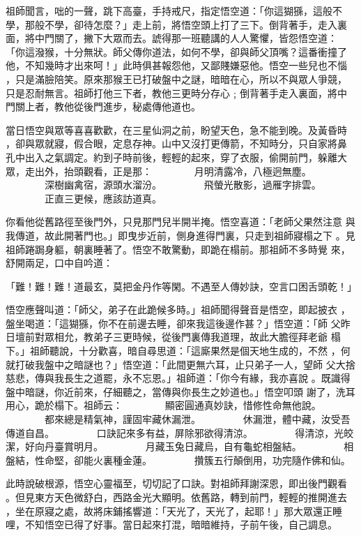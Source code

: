 \begin{pinyinscope}
{祖師聞言，咄的一聲，跳下高臺，手持戒尺，指定悟空道：「你這猢猻，這般不
學，那般不學，卻待怎麼？」走上前，將悟空頭上打了三下。倒背著手，走入裏
面，將中門關了，撇下大眾而去。諕得那一班聽講的人人驚懼，皆怨悟空道：
「你這潑猴，十分無狀。師父傳你道法，如何不學，卻與師父頂嘴？這番衝撞了
他，不知幾時才出來呵！」此時俱甚報怨他，又鄙賤嫌惡他。悟空一些兒也不惱
，只是滿臉陪笑。原來那猴王已打破盤中之謎，暗暗在心，所以不與眾人爭競，
只是忍耐無言。祖師打他三下者，教他三更時分存心﹔倒背著手走入裏面，將中
門關上者，教他從後門進步，秘處傳他道也。

當日悟空與眾等喜喜歡歡，在三星仙洞之前，盼望天色，急不能到晚。及黃昏時
，卻與眾就寢，假合眼，定息存神。山中又沒打更傳箭，不知時分，只自家將鼻
孔中出入之氣調定。約到子時前後，輕輕的起來，穿了衣服，偷開前門，躲離大
眾，走出外，抬頭觀看，正是那：
　　　　月明清露冷，八極迥無塵。
　　　　深樹幽禽宿，源頭水溜汾。
　　　　飛螢光散影，過雁字排雲。
　　　　正直三更候，應該訪道真。

你看他從舊路徑至後門外，只見那門兒半開半掩。悟空喜道：「老師父果然注意
與我傳道，故此開著門也。」即曳步近前，側身進得門裏，只走到祖師寢榻之下
。見祖師踡跼身軀，朝裏睡著了。悟空不敢驚動，即跪在榻前。那祖師不多時覺
來，舒開兩足，口中自吟道：


「難！難！難！道最玄，莫把金丹作等閑。不遇至人傳妙訣，空言口困舌頭乾！」

悟空應聲叫道：「師父，弟子在此跪候多時。」祖師聞得聲音是悟空，即起披衣
，盤坐喝道：「這猢猻，你不在前邊去睡，卻來我這後邊作甚？」悟空道：「師
父昨日壇前對眾相允，教弟子三更時候，從後門裏傳我道理，故此大膽徑拜老爺
榻下。」祖師聽說，十分歡喜，暗自尋思道：「這廝果然是個天地生成的，不然
，何就打破我盤中之暗謎也？」悟空道：「此間更無六耳，止只弟子一人，望師
父大捨慈悲，傳與我長生之道罷，永不忘恩。」祖師道：「你今有緣，我亦喜說
。既識得盤中暗謎，你近前來，仔細聽之，當傳與你長生之妙道也。」悟空叩頭
謝了，洗耳用心，跪於榻下。祖師云：
　　　　顯密圓通真妙訣，惜修性命無他說。
　　　　都來總是精氣神，謹固牢藏休漏泄。
　　　　休漏泄，體中藏，汝受吾傳道自昌。
　　　　口訣記來多有益，屏除邪欲得清涼。
　　　　得清涼，光皎潔，好向丹臺賞明月。
　　　　月藏玉兔日藏烏，自有龜蛇相盤結。
　　　　相盤結，性命堅，卻能火裏種金蓮。
　　　　攢簇五行顛倒用，功完隨作佛和仙。

此時說破根源，悟空心靈福至，切切記了口訣。對祖師拜謝深恩，即出後門觀看
。但見東方天色微舒白，西路金光大顯明。依舊路，轉到前門，輕輕的推開進去
，坐在原寢之處，故將床鋪搖響道：「天光了，天光了，起耶！」那大眾還正睡
哩，不知悟空已得了好事。當日起來打混，暗暗維持，子前午後，自己調息。

}
\end{pinyinscope}
